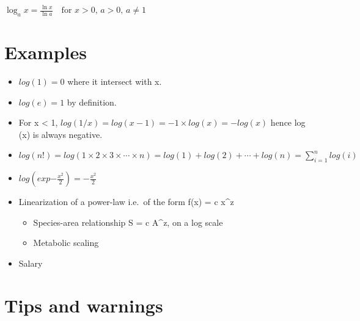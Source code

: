 \documentclass[
  letterpaper,
  DIV=11,
  numbers=noendperiod]{scrreprt}
\providecommand{\tightlist}{%
  \setlength{\itemsep}{0pt}\setlength{\parskip}{0pt}}
\begin{document}
\(\log_a x = \frac{\ln x}{\ln a} \quad \text{for } x > 0, \, a > 0, \, a \neq 1\)

\section*{Examples}\label{examples-11}


\begin{itemize}
\item
  \(log(1) = 0\) where it intersect with x.
\item
  \(log(e) = 1\) by definition.
\item
  For x \textless{} 1,
  \(log(1/x) = log(x-1) = - 1 \times log(x) = - log(x)\) hence log (x)
  is always negative.
\item
  \(log(n!) = log(1 \times 2 \times 3 \times \cdots \times n) =  log (1) + log (2) + \cdots + log(n) = \sum_{i = 1}^n log(i)\)
\item
  \(log(exp{- \frac{x^2}{2}}) = - \frac{x^2}{2}\)
\item
  Linearization of a power-law i.e.~of the form f(x) = c x\^{}z

  \begin{itemize}
  \tightlist
  \item
    Species-area relationship S = c A\^{}z, on a log scale
  \item
    Metabolic scaling
  \end{itemize}
\item
  Salary
\end{itemize}

\section*{Tips and warnings}\label{tips-and-warnings-4}

\end{document}
